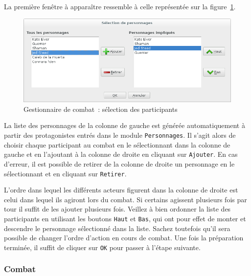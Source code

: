 \documentclass[a4paper,12pt]{article}
\newcommand*{\interfaceitem}[1]{\texttt{#1}}
\begin{document}
La première fenêtre à apparaître ressemble à celle représentée sur la figure~\ref{gestion_combat_choix}.
\begin{figure}[ht]
    \centerline{\includegraphics[width=1\textwidth]{gestionnaire_combat_prep}}
    \caption{Gestionnaire de combat~: sélection des participants}
    \label{gestion_combat_choix}
\end{figure}
La liste des personnages de la colonne de gauche est générée automatiquement à partir des protagonistes entrés dans le module \interfaceitem{Personnages}.
Il s'agit alors de choisir chaque participant au combat en le sélectionnant dans la colonne de gauche et en l'ajoutant à la colonne de droite en cliquant sur \interfaceitem{Ajouter}.
En cas d'erreur, il est possible de retirer de la colonne de droite un personnage en le sélectionnant et en cliquant sur \interfaceitem{Retirer}.

L'ordre dans lequel les différents acteurs figurent dans la colonne de droite est celui dans lequel ils agiront lors du combat.
Si certains agissent plusieurs fois par tour il suffit de les ajouter plusieurs fois.
Veillez à bien ordonner la liste des participants en utilisant les boutons \interfaceitem{Haut} et \interfaceitem{Bas}, qui ont pour effet de monter et descendre le personnage sélectionné dans la liste.
Sachez toutefois qu'il sera possible de changer l'ordre d'action en cours de combat.
Une fois la préparation terminée, il suffit de cliquer sur \interfaceitem{OK} pour passer à l'étape suivante.

\subsubsection{Combat}
\end{document}
